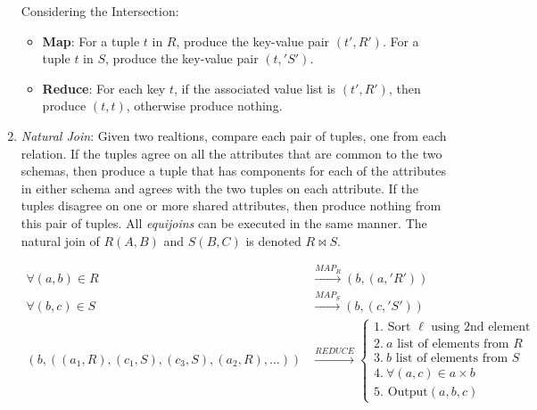 \begin{enumerate}
    Considering the Intersection: 
    \begin{itemize}
        \item \textbf{Map}: For a tuple $t$ in $R$, produce the key-value pair $(t', R')$. For a tuple $t$ in $S$, produce the key-value pair $(t, 'S')$.
        \item \textbf{Reduce}: For each key $t$, if the associated value list is $(t', R')$, then produce $(t, t)$, otherwise produce nothing.
    \end{itemize}

\item \textit{Natural Join}: Given two realtions, compare each pair of tuples, one from each relation. If the tuples agree on all the attributes that are common to the two schemas, then produce a tuple that has components for each of the attributes in either schema and agrees with the two tuples on each attribute. If the tuples disagree on one or more shared attributes, then produce nothing from this pair of tuples. All \textit{equijoins} can be executed in the same manner. The natural join of $R(A,B)$ and $S(B,C)$ is denoted $R \bowtie S$. 
    
    \begin{equation*}
        \begin{split}
                                          \forall (a,b)\in R & \xrightarrow{MAP_R} (b,(a, 'R')) \\
                                          \forall (b,c)\in S & \xrightarrow{MAP_S} (b, (c, 'S')) \\
            (b, ((a_1,R),(c_1, S), (c_3, S),(a_2, R),\dots)) & \xrightarrow{REDUCE} \begin{cases}
                                                                                        1. \text{ Sort } \ell \text{ using 2nd element} \\ 
                                                                                        2. \ a \text{ list of elements from } R \\
                                                                                        3. \ b \text{ list of elements from } S \\
                                                                                        4. \ \forall (a, c) \in a \times b \\ 
                                                                                        5. \text{ Output} (a, b, c)
                                                                                    \end{cases}
        \end{split}
    \end{equation*}


\end{enumerate}
